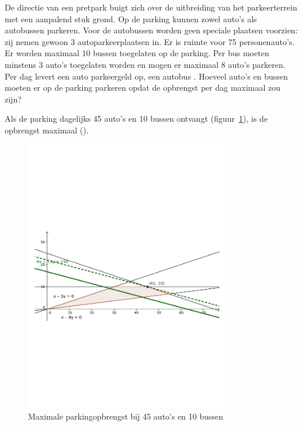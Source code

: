 \begin{oef}
De directie van een pretpark buigt zich over de uitbreiding van het
parkeerterrein met een aanpalend stuk grond. Op de parking kunnen zowel auto's als autobussen parkeren. Voor de autobussen worden geen speciale plaatsen voorzien: zij nemen gewoon 3 autoparkeerplaatsen in.  Er is ruimte voor 75
personenauto's.  Er worden maximaal 10 bussen toegelaten op de parking. 
Per bus moeten minstens 3 auto's toegelaten worden en mogen er maximaal 8 auto's parkeren.  Per dag levert een auto 
parkeergeld op, een autobus . Hoeveel auto's en bussen moeten er op de parking parkeren opdat de opbrengst per dag maximaal zou zijn? 
\begin{opl}
Als de parking dagelijks 45 auto's en 10 bussen ontvangt (figuur~\ref{fig:autobussen}), is de opbrengst maximaal ().
                 \begin{figure}[hbtp]
\centering
\includegraphics[width=0.8\textwidth]{oefeningen/FigurenLP/Oefautosbussen.pdf}
\caption{Maximale parkingopbrengst bij 45 auto's en 10 bussen}
\label{fig:autobussen}
\end{figure}
\end{opl}
\end{oef}

